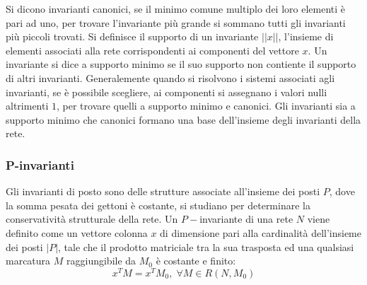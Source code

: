 \documentclass{article}
\numberwithin{equation}{subsection}
\begin{document}
Si dicono invarianti canonici, se il minimo comune multiplo dei loro elementi è pari ad uno, per trovare l'invariante più grande si sommano tutti gli invarianti più piccoli 
trovati. 
Si definisce il supporto di un invariante $||x||$, l'insieme di elementi associati alla rete corrispondenti ai componenti del vettore $x$. 
Un invariante si dice a supporto minimo se il suo supporto non contiente il supporto di altri invarianti.   
Generalemente quando si risolvono i sistemi associati agli invarianti, se è possibile scegliere, ai componenti si assegnano i valori nulli altrimenti $1$, per trovare quelli a 
supporto minimo e canonici. Gli invarianti sia a supporto minimo che canonici formano una base dell'insieme degli invarianti della rete. 


\subsubsection{P-invarianti}

Gli invarianti di posto sono delle strutture associate all'insieme dei posti $P$, dove la somma pesata dei gettoni è costante, si studiano per determinare la conservatività 
strutturale della rete. Un $P-$invariante di una rete $N$ viene definito come un vettore colonna $x$ di dimensione pari alla cardinalità dell'insieme dei posti $|P|$, tale 
che il prodotto matriciale tra la sua trasposta ed una qualsiasi marcatura $M$ raggiungibile da $M_0$ è costante e finito:
\begin{equation*}
    x^TM=x^TM_0,\;\forall M\in R(N,M_0)
\end{equation*} 
\end{document}

